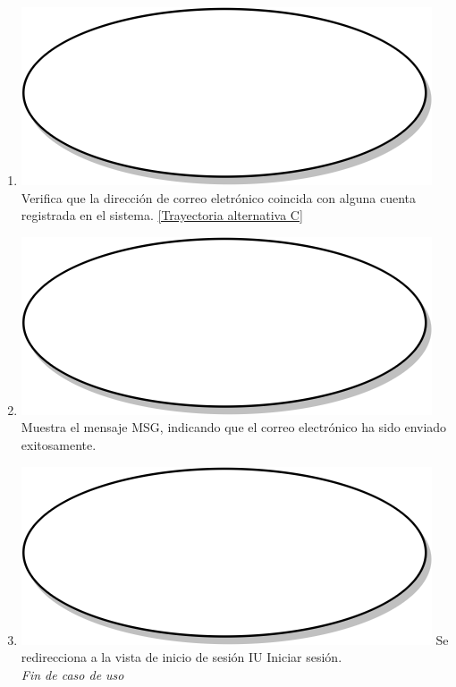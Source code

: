\begin{enumerate}
  \item {\includegraphics[scale=.05]{Capitulo3/img/proceso.png} Verifica que la dirección de correo eletrónico coincida con alguna cuenta registrada en el sistema. \hyperref[cu1_1_ta_c]{[Trayectoria alternativa C]}}
  \item {\includegraphics[scale=.05]{Capitulo3/img/proceso.png} Muestra el mensaje MSG, indicando que el correo electrónico ha sido enviado exitosamente.}
  \item {\includegraphics[scale=.1]{Capitulo3/img/proceso.png} Se redirecciona a la vista de inicio de sesión IU Iniciar sesión.} \\
  \textit{Fin de caso de uso} \\	
\end{enumerate}

